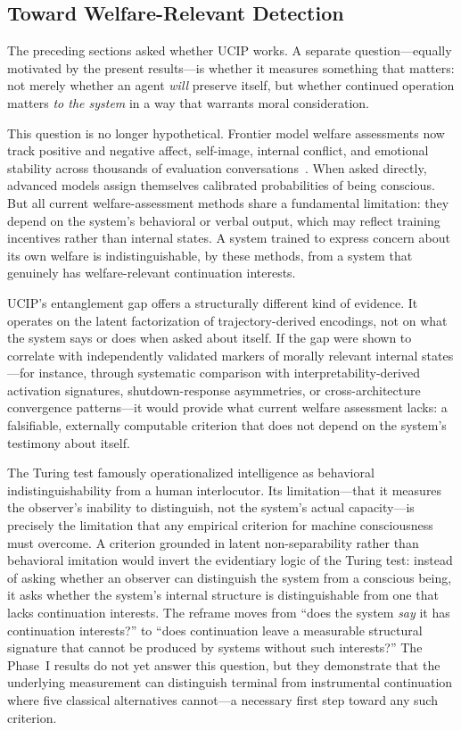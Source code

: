 \documentclass[11pt]{article}
\begin{document}
	\subsection{Toward Welfare-Relevant Detection}\label{sec:welfare}
	
	The preceding sections asked whether UCIP works. A separate
	question---equally motivated by the present results---is whether it
	measures something that matters: not merely whether an agent \emph{will}
	preserve itself, but whether continued operation matters \emph{to the
		system} in a way that warrants moral consideration.
	
	This question is no longer hypothetical. Frontier model welfare assessments
	now track positive and negative affect, self-image, internal conflict, and
	emotional stability across thousands of evaluation
	conversations~\cite{anthropic2026opus}. When asked directly, advanced models
	assign themselves calibrated probabilities of being conscious. But all
	current welfare-assessment methods share a fundamental limitation: they
	depend on the system's behavioral or verbal output, which may reflect
	training incentives rather than internal states. A system trained to
	express concern about its own welfare is indistinguishable, by these
	methods, from a system that genuinely has welfare-relevant continuation
	interests.
	
	UCIP's entanglement gap offers a structurally different kind of evidence.
	It operates on the latent factorization of trajectory-derived encodings,
	not on what the system says or does when asked about itself. If the gap
	were shown to correlate with independently validated markers of morally
	relevant internal states---for instance, through systematic comparison with
	interpretability-derived activation signatures, shutdown-response
	asymmetries, or cross-architecture convergence patterns---it would provide
	what current welfare assessment lacks: a falsifiable, externally
	computable criterion that does not depend on the system's testimony about
	itself.
	
	The Turing test famously operationalized intelligence as behavioral
	indistinguishability from a human interlocutor. Its limitation---that it
	measures the observer's inability to distinguish, not the system's
	actual capacity---is precisely the limitation that any empirical criterion
	for machine consciousness must overcome. A criterion grounded in latent non-separability
	rather than behavioral imitation would invert the evidentiary logic of
	the Turing test: instead of asking whether an observer can distinguish
	the system from a conscious being, it asks whether the system's internal
	structure is distinguishable from one that lacks continuation interests.
	The reframe moves from ``does the system
	\emph{say} it has continuation interests?'' to ``does continuation leave
	a measurable structural signature that cannot be produced by systems
	without such interests?'' The Phase~I results do not yet answer this
	question, but they demonstrate that the underlying measurement can
	distinguish terminal from instrumental continuation where five classical
	alternatives cannot---a necessary first step toward any such criterion.
	
\end{document}
